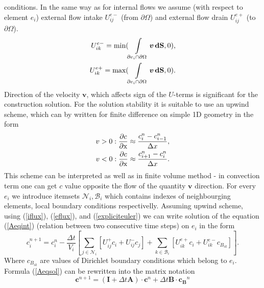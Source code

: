   conditions. In the same way as for internal flows we assume
  (with respect to element $e_i$) external flow intake $U_{ij}^{e-}$ (from $\partial\Omega$) and external flow drain $U_{ij}^{e+}$ (to $\partial\Omega$).
    \begin{eqnarray}     
      U_{ik}^{e-} = \text{min}(\int\limits_{\partial e_i \cap \partial \Omega } \boldsymbol{v} \, \mathbf{dS},0), \notag \\
      U_{ik}^{e+} = \text{max}(\int\limits_{\partial e_i \cap \partial \Omega } \boldsymbol{v} \, \mathbf{dS},0). \label{eflux}  
    \end{eqnarray}
    Direction of the velocity $\boldsymbol{v}$, which affects sign of the $U$-terms is significant for the construction solution. For the solution
    stability it is suitable to use an upwind scheme, which can by written for finite difference on simple 1D geometry in the form
    \begin{eqnarray} 
      v>0 : \frac{\partial c}{\partial \textrm{x}} \approx \frac{c_{i}^n - c_{i-1}^n}{\Delta x},   \notag \\
      v<0 : \frac{\partial c}{\partial \textrm{x}} \approx \frac{c_{i+1}^n - c_i^n}{\Delta x}.   \label{upwind} 
    \end{eqnarray}
    This scheme can be interpreted as well as in finite volume method - in convection term one can get $c$ value opposite the flow of the quantity $\boldsymbol{v}$ direction.
      For every $e_i$ we introduce itemsets $\mathcal{N}_{i}, \mathcal{B}_{i}$ which contains indexes of neighbourging elements, local boundary conditions respectivelly.  
     Assuming upwind scheme, using (\ref{iflux}), (\ref{eflux}), and  (\ref{expliciteuler}) we can write solution of the equation (\ref{Aeqint}) 
    (relation between two consecutive time steps) on $e_i$ in the form 
    \begin{equation}
      c_i^{n+1} = c_i^n - \frac{\Delta t}{V_{i}} \left[ \sum_{j \in \mathcal{N}_{i}} \left[ U_{ij}^{+} c_i +  U_{ij}^{-} c_{j} \right] +
      \sum_{k \in \mathcal{B}_{i}}  \left[  U_{ik}^{e+} c_i +  U_{ik}^{e-} c_{B_{ik}} \right] \right]. \label{Aeqsol}
    \end{equation}
    Where $c_{B_{ik}}$ are values of Dirichlet boundary conditions which belong to $e_i$. Formula (\ref{Aeqsol}) can be rewritten into the matrix notation
    \begin{equation}
     \mathbf{c}^{n+1} = (\mathbf{I} + \Delta t \mathbf{A}) \cdot \mathbf{c}^{n} + \Delta t \mathbf{B} \cdot \mathbf{c_{B}}^{n} \label{AeqsolM}
    \end{equation}
